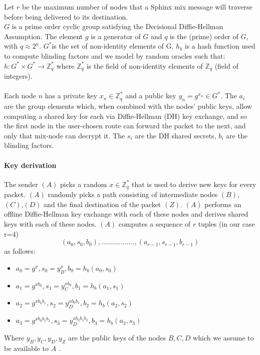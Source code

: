 Let $r$ be the maximum number of nodes that a Sphinx mix message will traverse before being delivered to its destination. 
\\$G$ is a prime order cyclic group satisfying the Decisional Diffie-Hellman Assumption. The element $g$ is a generator of $G$ and $q$ is the (prime) order of $G$, with $q\approx2^{\kappa}$.
$G^*$is the set of non-identity elements of G. $h_b$ is a hash function used to compute blinding factors and we model by random oracles such that:
$h:G^*\times G^*\rightarrow\mathbb{Z}^*_q$ where $\mathbb{Z}^*_q$ is the field of non-identity elements of $\mathbb{Z}_q$ (field of integers).
\\~\\Each node $n$ has a private key $x_n\in \mathbb{Z}^*_q$ and a public key $y_n=g^{x_n}\in G^*$.
The $a_i$ are the group elements which, when combined with the nodes’ public keys, allow computing a shared key for each via Diffie-Hellman (DH) key exchange, and so the first node in the user-chosen route can forward the packet to the next, and only that mix-node can decrypt it.
The $s_i$ are the DH shared secrets, $b_i$ are the blinding factors. 

\paragraph{Key derivation}
The sender $(A)$ picks a random $x\in \mathbb{Z}^*_q$ that is used to derive new keys for every packet. 
\newline $(A)$ randomly picks a path consisting of intermediate nodes $(B)$, $(C)$,$(D)$ and the final destination of the packet $(Z)$. 
\newline $(A)$ performs an offline Diffie-Hellman key exchange with each of these nodes and derives shared keys with each of these nodes.
\newline $(A)$ computes a sequence of $r$ tuples (in our case r=4)  $$(a_0,s_0,b_0),.................,(a_{r-1},s_{r-1},b_{r-1})$$ as follows:
\begin{itemize}
\item $a_0=g^x,s_0=y^x_B,b_0=h_b(a_0,s_0)$
\item $a_1=g^{xb_0},s_1=y^{xb_0}_C,b_1=h_b(a_1,s_1)$
\item $a_2=g^{xb_0b_1},s_2=y^{xb_0b_1}_D,b_2=h_b(a_2,s_2)$
\item $a_3=g^{xb_0b_1b_2},s_3=y^{xb_0b_1b_2}_D,b_3=h_b(a_3,s_3)$
\end{itemize}
 Where $y_B,y_C,y_D,y_Z$ are the public keys of the nodes $B,C, D$  which we assume to be available to $A$ .

